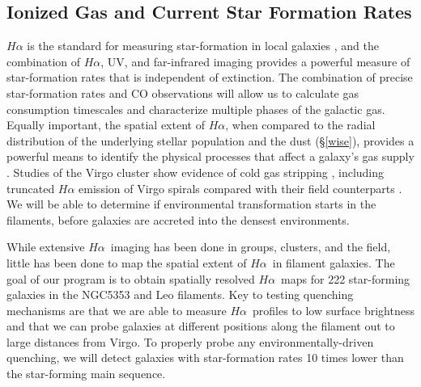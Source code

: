 \documentclass[11pt, preprint]{aastex}
\newcommand{\ha}{$H\alpha$}
\begin{document}
\vspace*{-1cm}
\subsection{Ionized Gas and Current Star Formation Rates}
\vspace*{-.3cm}

$H\alpha$ is the standard for measuring star-formation in local galaxies
\citep[e.g.][]{kennicutt98}, and the combination of \ha, UV, 
and far-infrared imaging provides a powerful measure of star-formation
rates that is independent of extinction.  The
combination of precise star-formation rates and CO observations will allow us to calculate
gas consumption timescales and characterize multiple phases of the
galactic gas. 
Equally important, the spatial extent of \ha, when compared to the
radial distribution of the underlying stellar population and the dust (\S\ref{wise}), provides a powerful
means to identify the physical processes that affect a galaxy's gas
supply \citep[e.g.][]{hodge83, dale01, gavazzi12,boselli15}.
Studies of the Virgo cluster show evidence of cold gas stripping
\citep[e.g.][]{koopmann98, koopmann04, dale01, crowl05, chung07,
  corbelli12, gavazzi12, boselli15}, including truncated $H\alpha$ emission of Virgo spirals
compared with their field counterparts \citep{koopmann04}.
We will be able to determine if environmental transformation starts in
the filaments, before galaxies are accreted into the densest environments.

While extensive \ha \ imaging has been done in groups, clusters, and the field,
little has been done to map the spatial extent of \ha \ in filament
galaxies.  
The goal of our program is to obtain spatially resolved \ha \ maps for 222 star-forming galaxies in
the NGC5353 and Leo filaments. Key to testing quenching mechanisms are that we are able to measure \ha \ profiles to low surface brightness and that we can
probe galaxies at different positions along the filament out to large
distances from Virgo.
To properly probe any environmentally-driven quenching, we will detect galaxies
with star-formation rates 10 times lower than the star-forming main sequence. 
\end{document}
